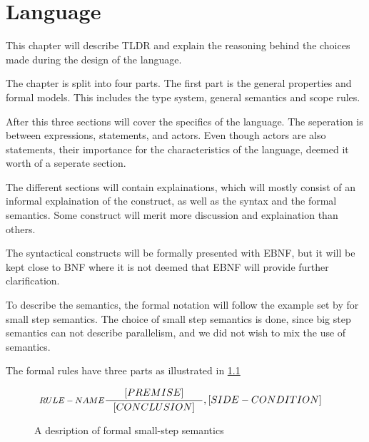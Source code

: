 \chapter{Language}\label{part:design}

This chapter will describe TLDR and explain the reasoning behind the choices made during the design of the language.

The chapter is split into four parts. The first part is the general properties and formal models. This includes the type system, general semantics and scope rules.

After this three sections will cover the specifics of the language. The seperation is between expressions, statements, and actors. Even though actors are also statements, their importance for the characteristics of the language, deemed it worth of a seperate section.

The different sections will contain explainations, which will mostly consist of an informal explaination of the construct, as well as the syntax and the formal semantics. Some construct will merit more discussion and explaination than others.

The syntactical constructs will be formally presented with EBNF, but it will be kept close to BNF where it is not deemed that EBNF will provide further clarification. 

To describe the semantics, the formal notation will follow the example set by  for small step semantics. The choice of small step semantics is done, since big step semantics can not describe parallelism, and we did not wish to mix the use of semantics.

The formal rules have three parts as illustrated in \cref{SS-semantics}

\begin{figure}[H]
\begin{align*}
&\inference[$RULE-NAME$]{[PREMISE]}
                        {[CONCLUSION]}
                        {,[SIDE-CONDITION]}
\end{align*}
\caption{A desription of formal small-step semantics}
\label{SS-semantics}
\end{figure}







